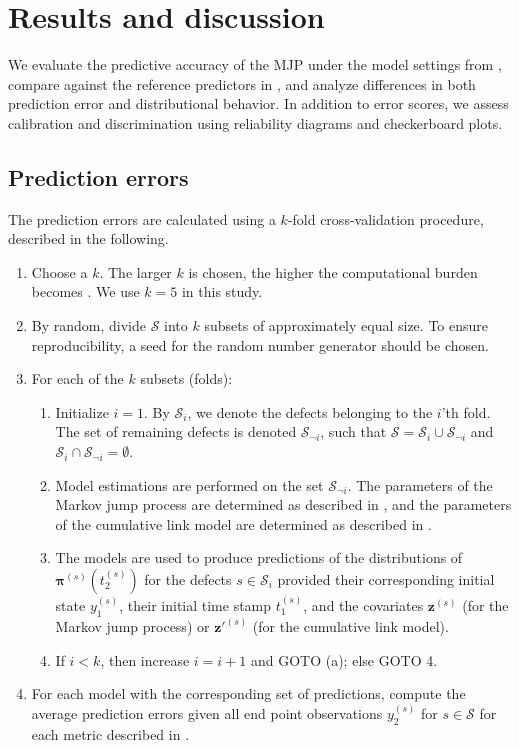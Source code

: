 

\section{Results and discussion} \label{sec:results}
We evaluate the predictive accuracy of the MJP under the model settings from , compare against the reference predictors in , and analyze differences in both prediction error and distributional behavior. In addition to error scores, we assess calibration and discrimination using reliability diagrams and checkerboard plots.

\subsection{Prediction errors} \label{sec:prediction_error}
The prediction errors are calculated using a $k$-fold cross-validation procedure, described in the following. 

\begin{enumerate}
    \item Choose a $k$. The larger $k$ is chosen, the higher the computational burden becomes \citep{fushiki2011a}. We use $k = 5$ in this study.
    \item By random, divide $\mathcal{S}$ into $k$ subsets of approximately equal size. To ensure reproducibility, a seed for the random number generator should be chosen.
    \item For each of the $k$ subsets (folds):
    \begin{enumerate}
        \item Initialize $i = 1$. By $\mathcal{S}_i$, we denote the defects belonging to the $i$'th fold. The set of remaining defects is denoted $\mathcal{S}_{\neg i}$, such that $\mathcal{S} = \mathcal{S}_i \cup \mathcal{S}_{\neg i}$ and $\mathcal{S}_i \cap \mathcal{S}_{\neg i} = \emptyset$.
        \item Model estimations are performed on the set $\mathcal{S}_{\neg i}$. The parameters of the Markov jump process are determined as described in , and the parameters of the cumulative link model are determined as described in .
        \item The models are used to produce predictions of the distributions of $\bm{\pi}^{(s)}\left( t_2^{(s)}\right)$ for the defects $s \in \mathcal{S}_i$ provided their corresponding initial state $y_1^{(s)}$, their initial time stamp $t_1^{(s)}$, and the covariates $\bm{z}^{(s)}$ (for the Markov jump process) or $\bm{z}'^{(s)}$ (for the cumulative link model).
        \item If $i < k$, then increase $i = i + 1$ and GOTO (a); else GOTO 4.
    \end{enumerate}
    \item For each model with the corresponding set of predictions, compute the average prediction errors given all end point observations $y_2^{(s)}$ for $s \in \mathcal{S}$ for each metric described in .
\end{enumerate}

